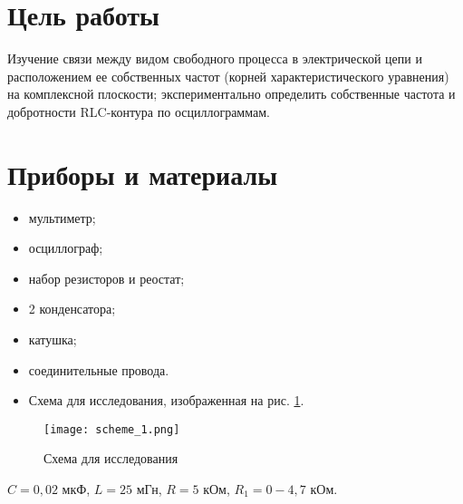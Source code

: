 \section{Цель работы}

Изучение связи между видом свободного процесса в электрической
цепи и расположением ее собственных частот (корней
характеристического уравнения) на комплексной плоскости;
экспериментально определить собственные частота и добротности
RLC-контура по осциллограммам.





\section{Приборы и материалы}

\begin{itemize}
    \item мультиметр;
    \item осциллограф;
    \item набор резисторов и реостат;
    \item 2 конденсатора;
    \item катушка;
    \item соединительные провода.
    \item Схема для исследования, изображенная на рис. \ref*{fig:scheme_1}.
\end{itemize}

\begin{figure}[!h]
    \centering
    \texttt{[image: scheme\_1.png]}
    \caption{Схема для исследования}
    \label{fig:scheme_1}
\end{figure}

$C = 0,02$ мкФ, $L = 25$ мГн, $R = 5$ кОм, $R_1 = 0-4,7$ кОм.